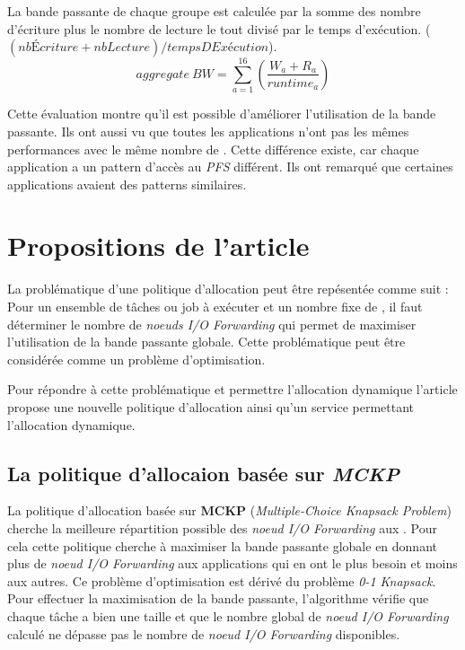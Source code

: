 \documentclass[10pt, a4paper]{article}
\begin{document}
La bande passante de chaque groupe est calculée par la somme des nombre d'écriture plus le nombre de lecture le tout divisé par le temps d'exécution. ($(nbÉcriture + nbLecture) / tempsDExécution$).
\begin{equation*}aggregate\ BW=\sum_{a=1}^{16}\left(\frac{W_{a}+R_{a}}{runtime_{a}}\right) \tag{2}\end{equation*}

Cette évaluation montre qu'il est possible d'améliorer l'utilisation de la bande passante.
Ils ont aussi vu que toutes les applications n'ont pas les mêmes performances avec le même nombre de \noeudsIO{}. Cette différence existe, car chaque application a un pattern d'accès au \emph{PFS} différent. Ils ont remarqué que certaines applications avaient des patterns similaires.

\section{Propositions de l'article}

La problématique d'une politique d'allocation peut être repésentée comme suit :
Pour un ensemble de tâches ou job à exécuter et un nombre fixe de \noeudsIO{}, il faut déterminer le nombre de \emph{noeuds I/O Forwarding} qui permet de maximiser l'utilisation de la bande passante globale.
Cette problématique peut être considérée comme un problème d'optimisation.

Pour répondre à cette problématique et permettre l'allocation dynamique l'article propose une nouvelle politique d'allocation ainsi qu'un service permettant l'allocation dynamique.

\subsection{La politique d'allocaion basée sur \emph{MCKP}}

La politique d'allocation basée sur \textbf{MCKP} (\emph{Multiple-Choice Knapsack Problem}) cherche la meilleure répartition possible des \emph{noeud I/O Forwarding} aux \noeudsDeCalculs{}.
Pour cela cette politique cherche à maximiser la bande passante globale en donnant plus de \emph{noeud I/O Forwarding} aux applications qui en ont le plus besoin et moins aux autres. Ce problème d'optimisation est dérivé du problème \emph{0-1 Knapsack}.
Pour effectuer la maximisation de la bande passante, l'algorithme vérifie que chaque tâche a bien une taille et que le nombre global de \emph{noeud I/O Forwarding} calculé ne dépasse pas le nombre de \emph{noeud I/O Forwarding} disponibles.
\end{document}
